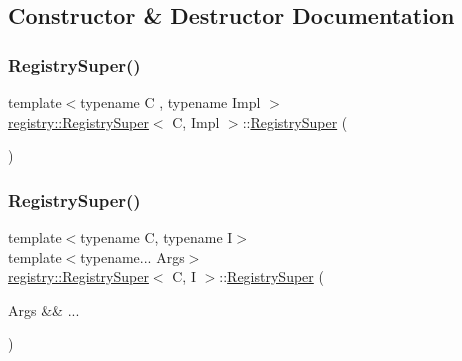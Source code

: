 \subsection{Constructor \& Destructor Documentation}
\mbox{\label{classregistry_1_1RegistrySuper_a07a71ff200feeaa1252153f9bacac6c2}} 
\subsubsection{\texorpdfstring{Registry\+Super()}{RegistrySuper()}\hspace{0.1cm}{\footnotesize\ttfamily [1/5]}}
{\footnotesize\ttfamily template$<$typename C , typename Impl $>$ \\
\hyperlink{classregistry_1_1RegistrySuper}{registry\+::\+Registry\+Super}$<$ C, Impl $>$\+::\hyperlink{classregistry_1_1RegistrySuper}{Registry\+Super} (\begin{DoxyParamCaption}{ }\end{DoxyParamCaption})\hspace{0.3cm}{\ttfamily [noexcept]}}

\mbox{\label{classregistry_1_1RegistrySuper_adcd4a5b588b3f91c9fa8f89a3d4a0c17}} 
\subsubsection{\texorpdfstring{Registry\+Super()}{RegistrySuper()}\hspace{0.1cm}{\footnotesize\ttfamily [2/5]}}
{\footnotesize\ttfamily template$<$typename C, typename I$>$ \\
template$<$typename... Args$>$ \\
\hyperlink{classregistry_1_1RegistrySuper}{registry\+::\+Registry\+Super}$<$ C, I $>$\+::\hyperlink{classregistry_1_1RegistrySuper}{Registry\+Super} (\begin{DoxyParamCaption}\item[{Args \&\&}]{... }\end{DoxyParamCaption})\hspace{0.3cm}{\ttfamily [noexcept]}}



